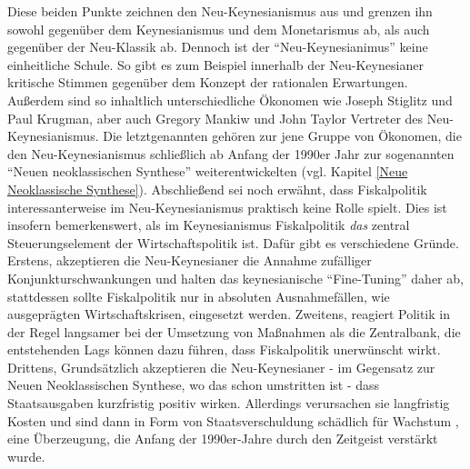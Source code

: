 Diese beiden Punkte zeichnen den Neu-Keynesianismus aus und grenzen ihn sowohl gegenüber dem Keynesianismus und dem Monetarismus ab, als auch gegenüber der Neu-Klassik ab. Dennoch ist der "`Neu-Keynesianimus"' keine einheitliche Schule. So gibt es zum Beispiel innerhalb der Neu-Keynesianer kritische Stimmen gegenüber dem Konzept der rationalen Erwartungen. Außerdem sind so inhaltlich unterschiedliche Ökonomen wie Joseph Stiglitz und Paul Krugman, aber auch Gregory Mankiw und John Taylor Vertreter des Neu-Keynesianismus. Die letztgenannten gehören zur jene Gruppe von Ökonomen, die den Neu-Keynesianismus schließlich ab Anfang der 1990er Jahr zur sogenannten "`Neuen neoklassischen Synthese"' weiterentwickelten (vgl. Kapitel \ref{Neue Neoklassische Synthese}).
Abschließend sei noch erwähnt, dass Fiskalpolitik interessanterweise im Neu-Keynesianismus praktisch keine Rolle spielt. Dies ist insofern bemerkenswert, als im Keynesianismus Fiskalpolitik \textit{das} zentral Steuerungselement der Wirtschaftspolitik ist. Dafür gibt es verschiedene Gründe. Erstens, akzeptieren die Neu-Keynesianer die Annahme zufälliger Konjunkturschwankungen und halten das keynesianische "`Fine-Tuning"' daher ab, stattdessen sollte Fiskalpolitik nur in absoluten Ausnahmefällen, wie ausgeprägten Wirtschaftskrisen, eingesetzt werden. Zweitens, reagiert Politik in der Regel langsamer bei der Umsetzung von Maßnahmen als die Zentralbank, die entstehenden Lags können dazu führen, dass Fiskalpolitik unerwünscht wirkt. Drittens, Grundsätzlich akzeptieren die Neu-Keynesianer - im Gegensatz zur Neuen Neoklassischen Synthese, wo das schon umstritten ist - dass Staatsausgaben kurzfristig positiv wirken. Allerdings verursachen sie langfristig Kosten und sind dann in Form von Staatsverschuldung schädlich für Wachstum \parencite[S. 447]{Snowdon2005}, eine Überzeugung, die Anfang der 1990er-Jahre durch den Zeitgeist verstärkt wurde.